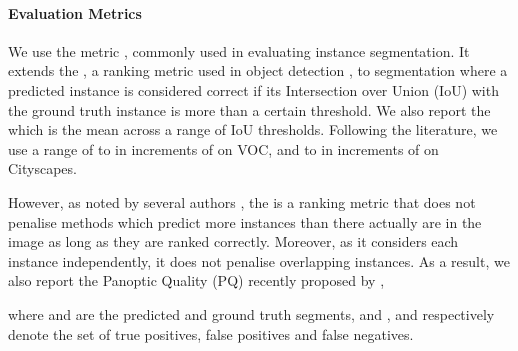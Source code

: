 \documentclass[runningheads]{llncs}
\begin{document}
\paragraph{Evaluation Metrics}
We use the  metric \cite{hariharan_2014}, commonly used in evaluating instance segmentation.
It extends the , a ranking metric used in object detection \cite{everingham_2010}, to segmentation where a predicted instance is considered correct if its Intersection over Union (IoU) with the ground truth instance is more than a certain threshold.
We also report the  which is the mean  across a range of IoU thresholds.
Following the literature, we use a range of  to  in increments of  on VOC, and  to  in increments of  on Cityscapes.

However, as noted by several authors \cite{yang_2012,arnab_cvpr_2017,bai_cvpr_2017,kirillov_arxiv_2018}, the  is a ranking metric that does not penalise methods which predict more instances than there actually are in the image as long as they are ranked correctly.
Moreover, as it considers each instance independently, it does not penalise overlapping instances.
As a result, we also report the Panoptic Quality (PQ) recently proposed by \cite{kirillov_arxiv_2018},
\newcommand{\TP}{\mathit{TP}}
\newcommand{\FN}{\mathit{FN}}
\newcommand{\FP}{\mathit{FP}}
\newcommand{\IoU}{\text{IoU}}

where  and  are the predicted and ground truth segments, and ,  and  respectively denote the set of true positives, false positives and false negatives.
\end{document}
